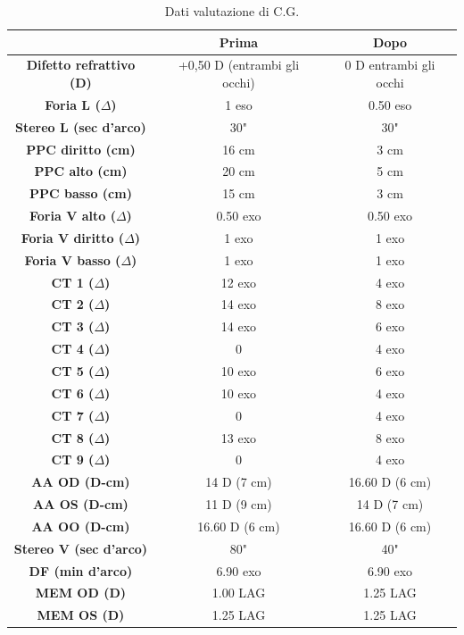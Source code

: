 \begin{table}[H]
\begin{center}
\begin{tabular}{|c|c|c|} \hline
{\textbf{}} & {\textbf{Prima}} & {\textbf{Dopo}}\\ \hline
\textbf{Difetto refrattivo (D)} & +0,50 D (entrambi gli occhi) & 0 D entrambi gli occhi \\ \hline
\textbf{Foria L ($\Delta$)} & 1 eso & 0.50 eso \\ \hline
\textbf{Stereo L (sec d'arco)} & 30" & 30" \\ \hline
\textbf{PPC diritto (cm)} & 16 cm & 3 cm \\ \hline
\textbf{PPC alto (cm)} & 20 cm & 5 cm \\ \hline
\textbf{PPC basso (cm)} & 15 cm & 3 cm\\ \hline
\textbf{Foria V alto ($\Delta$)} & 0.50 exo & 0.50 exo \\ \hline
\textbf{Foria V diritto ($\Delta$)} & 1 exo & 1 exo \\ \hline
\textbf{Foria V basso ($\Delta$)} & 1 exo & 1 exo \\ \hline
\textbf{CT 1 ($\Delta$)} & 12 exo & 4 exo \\ \hline
\textbf{CT 2 ($\Delta$)} & 14 exo & 8 exo \\ \hline
\textbf{CT 3 ($\Delta$)} & 14 exo & 6 exo \\ \hline
\textbf{CT 4 ($\Delta$)} & 0 & 4 exo \\ \hline
\textbf{CT 5 ($\Delta$)} & 10 exo & 6 exo \\ \hline
\textbf{CT 6 ($\Delta$)} & 10 exo & 4 exo \\ \hline
\textbf{CT 7 ($\Delta$)} & 0 & 4 exo \\ \hline
\textbf{CT 8 ($\Delta$)} & 13 exo & 8 exo \\ \hline
\textbf{CT 9 ($\Delta$)} & 0 & 4 exo \\ \hline
\textbf{AA OD (D-cm)} & 14 D (7 cm) & 16.60 D (6 cm)\\ \hline
\textbf{AA OS (D-cm)} & 11 D (9 cm) & 14 D (7 cm)\\ \hline
\textbf{AA OO (D-cm)} & 16.60 D (6 cm) & 16.60 D (6 cm) \\ \hline
\textbf{Stereo V (sec d'arco)} & 80" & 40" \\ \hline
\textbf{DF (min d'arco)} & 6.90 exo & 6.90 exo\\ \hline
\textbf{MEM OD (D)} & 1.00 LAG  & 1.25 LAG \\ \hline
\textbf{MEM OS (D)} & 1.25 LAG & 1.25 LAG\\ \hline

\hline
\end{tabular}
\end{center}
\caption{Dati valutazione di C.G.}
\end{table}

